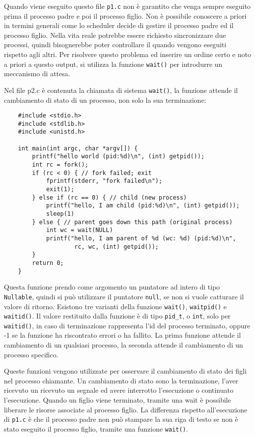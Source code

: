 \documentclass{article}
\numberwithin{equation}{subsection}
\begin{document}
Quando viene eseguito questo file \verb|p1.c| non è garantito che venga sempre eseguito prima il processo padre e poi il processo figlio. Non è possibile 
conoscere a priori in termini generali come lo scheduler decide di gestire il processo padre ed il processo figlio. Nella vita reale potrebbe essere richiesto sincronizzare 
due processi, quindi bisognerebbe poter controllare il quando vengono eseguiti rispetto agli altri. Per risolvere questo problema ed inserire un 
ordine certo e noto a priori a questo output, si utilizza la funzione \verb|wait()| per introdurre un meccanismo di attesa. 


Nel file p2.c è contenuta la chiamata di sistema \verb|wait()|, la funzione attende il cambiamento di stato di un processo, non solo la sua terminazione: 
\begin{verbatim}
    #include <stdio.h>
    #include <stdlib.h>
    #include <unistd.h>
    
    int main(int argc, char *argv[]) {
        printf("hello world (pid:%d)\n", (int) getpid());
        int rc = fork();
        if (rc < 0) { // fork failed; exit
            fprintf(stderr, "fork failed\n");
            exit(1);
        } else if (rc == 0) { // child (new process)
            printf("hello, I am child (pid:%d)\n", (int) getpid());
            sleep(1)
        } else { // parent goes down this path (original process)
            int wc = wait(NULL)
            printf("hello, I am parent of %d (wc: %d) (pid:%d)\n", 
                    rc, wc, (int) getpid());
        }
        return 0;
    }
\end{verbatim}
Questa funzione prendo come argomento un puntatore ad intero di tipo \verb|Nullable|, quindi si può utilizzare il puntatore 
\verb|null|, se non si vuole catturare il valore di ritorno. Esistono tre varianti della funzione \verb|wait()|, \verb|waitpid()| e \verb|waitid()|. 
Il valore restituito dalla funzione è di tipo \verb|pid_t|, o \verb|int|, solo per \verb|waitid()|, in caso di terminazione rappresenta l'id del processo terminato, 
oppure -1 se la funzione ha riscontrato errori o ha fallito. 
La prima funzione attende il cambiamento di un qualsiasi processo, la seconda attende il cambiamento di un processo specifico. 

Queste funzioni vengono utilizzate per osservare il cambiamento di stato dei figli nel processo chiamante. Un cambiamento di stato sono la terminazione, l'aver 
ricevuto un ricevuto un segnale ed avere interrotto l'esecuzione o continuato l'esecuzione. Quando un figlio viene terminato, tramite una wait è possibile liberare 
le risorse associate al processo figlio.  
La differenza rispetto all'esecuzione di \verb|p1.c| è che il processo padre non può stampare la sua riga di testo se non è stato eseguito il processo figlio, tramite 
una funzione \verb|wait()|. 
\end{document}
